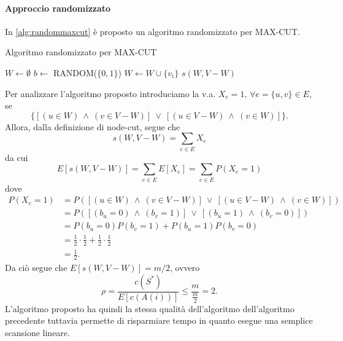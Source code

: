 \paragraph*{Approccio randomizzato}
In \ref{alg:randommaxcut} è proposto un algoritmo randomizzato per MAX-CUT.

\begin{algorithm}
\caption{Algoritmo randomizzato per MAX-CUT}
\label{alg:randommaxcut}
\begin{algorithmic}
	\State $W\gets\emptyset$
		\State $b\gets$ RANDOM($\{0,1\}$)
			\State $W\gets W\cup \{v_i\}$
		\EndIf
	\EndFor
	\State \Return $s(W,V-W)$
\EndFunction
\end{algorithmic}
\end{algorithm}

Per analizzare l'algoritmo proposto introduciamo la v.a. $X_e=1$, $\forall e=\{u,v\}\in E$, se
\[
\{[(u\in W)\ \land\ (v\in V-W)]\ \lor\ [(u\in V-W)\ \land\ (v\in W)]\}.
\]
Allora, dalla definizione di node-cut, segue che
\[
s(W,V-W)=\sum_{e\in E}X_e
\]
da cui
\[
E[s(W,V-W)]=\sum_{e\in E}E[X_e]=\sum_{e\in E}P(X_e=1)
\]
dove
\begin{align*}
P(X_e=1)&=P([(u\in W)\ \land\ (v\in V-W)]\ \lor\ [(u\in V-W)\ \land\ (v\in W)]) \\
&=P([(b_u=0)\ \land\ (b_v=1)]\ \lor\ [(b_u=1)\ \land\ (b_v=0)]) \\
&=P(b_u=0)P(b_v=1) + P(b_u=1)P(b_v=0) \\
&=\frac{1}{2}\cdot\frac{1}{2} + \frac{1}{2}\cdot\frac{1}{2} \\
&=\frac{1}{2}.
\end{align*}
Da ciò segue che $E[s(W,V-W)]=m/2$, ovvero
\[
\rho = \frac{c(S^*)}{E[c(A(i))]} \leq \frac{m}{\frac{m}{2}} = 2.
\]
L'algoritmo proposto ha quindi la stessa qualità dell'algoritmo dell'algoritmo precedente tuttavia permette di risparmiare tempo in quanto esegue una semplice scansione lineare.
